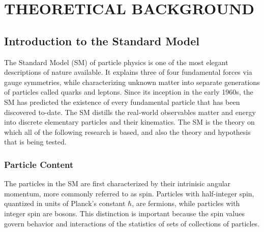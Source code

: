 %
%
%
%
%
%
%
%
%
%


%
%

\chapter{THEORETICAL BACKGROUND}
\section{Introduction to the Standard Model}
The Standard Model (SM) of particle physics is one of the most elegant descriptions of nature available. It explains three of four fundamental forces via gauge symmetries, while characterizing unknown matter into
separate generations of particles called quarks and leptons. Since its inception in the early 1960s, the SM has predicted the existence of every fundamental particle that has been discovered to-date.
The SM distills the real-world observables matter and energy into discrete elementary particles and their kinematics. The SM is the theory on which all of the following research is based, and also the theory and hypothesis that is being tested.

\subsection{Particle Content}
The particles in the SM are first characterized by their intrinisic angular momentum, more commonly referred to as spin. Particles with half-integer spin, quantized in units of Planck's constant $\hbar$, are fermions, while particles with integer spin are bosons.
This distinction is important because the spin values govern behavior and interactions of the statistics of sets of collections of particles. 


